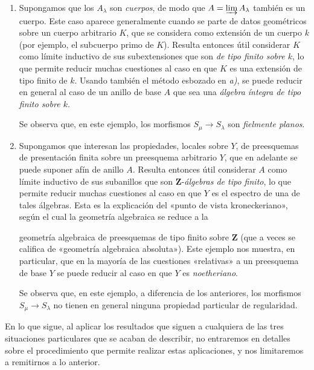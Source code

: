 \begin{env}[8.1.2]
\begin{enumerate}[label=\emph{\alph*)}]
Se observa que, en el ejemplo considerado aquí, los morfismos $S_\mu\to S_\lambda$ (para $\lambda\leq\mu$) son las \emph{inmersiones abiertas} canónicas $U_\mu\to U_\lambda$ y, \emph{a fortiori}, son morfismos \emph{planos} (aunque en general no fielmente planos), lo que explica el interés de los enunciados que recurren a tal restricción.

  \item
  Supongamos que los $A_\lambda$ son \emph{cuerpos}, de modo que $A=\varinjlim A_\lambda$ también es un cuerpo.
Este caso aparece generalmente cuando se parte de datos geométricos sobre un cuerpo arbitrario $K$, que se considera como extensión de un cuerpo $k$ (por ejemplo, el subcuerpo primo de $K$).
Resulta entonces útil considerar $K$ como límite inductivo de sus subextensiones que son \emph{de tipo finito sobre $k$}, lo que permite reducir muchas cuestiones al caso en que $K$ es una extensión de tipo finito de $k$.
Usando también el método esbozado en \emph{a)}, se puede reducir en general al caso de un anillo de base $A$ que sea una \emph{álgebra íntegra de tipo finito sobre $k$}.

Se observa que, en este ejemplo, los morfismos $S_\mu\to S_\lambda$ son \emph{fielmente planos}.

  \item
  Supongamos que interesan las propiedades, locales sobre $Y$, de preesquemas de presentación finita sobre un preesquema arbitrario $Y$, que en adelante se puede suponer afín de anillo $A$.
Resulta entonces útil considerar $A$ como límite inductivo de sus subanillos que son $\mathbf Z$-\emph{álgebras de tipo finito}, lo que permite reducir muchas cuestiones al caso en que $Y$ es el espectro de una de tales álgebras.
Esta es la explicación del «punto de vista kroneckeriano», según el cual la geometría algebraica se reduce a la

geometría algebraica de preesquemas de tipo finito sobre $\mathbf Z$ (que a veces se califica de
«geometría algebraica absoluta»).
Este ejemplo nos muestra, en particular, que en la mayoría de las cuestiones «relativas» a un preesquema de base $Y$ se puede reducir al caso en que $Y$ es \emph{noetheriano}.

Se observa que, en este ejemplo, a diferencia de los anteriores, los morfismos $S_\mu\to S_\lambda$ no tienen en general ninguna propiedad particular de regularidad.
\end{enumerate}

En lo que sigue, al aplicar los resultados que siguen a cualquiera de las tres situaciones particulares que se acaban de describir, no entraremos en detalles sobre el procedimiento que permite realizar estas aplicaciones, y nos limitaremos a remitirnos a lo anterior.
\end{env}

